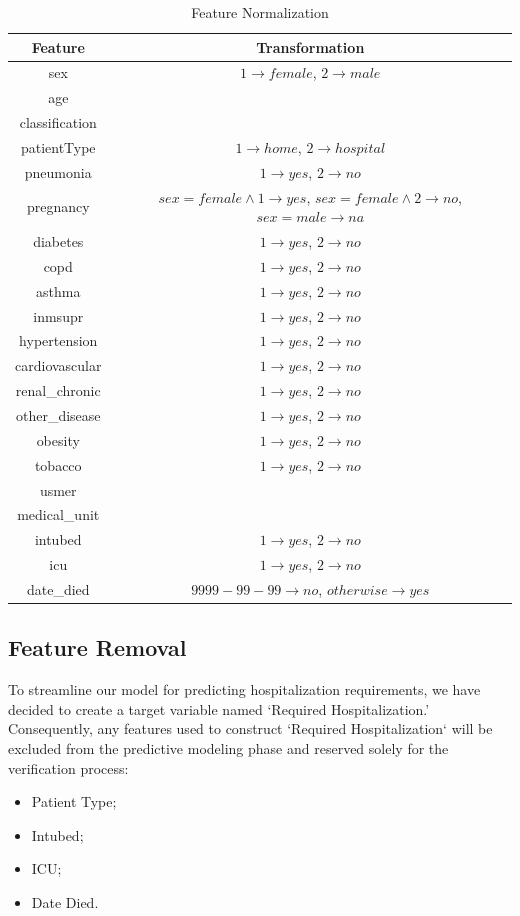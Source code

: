 \begin{table}[H]
    \centering
    \caption{Feature Normalization}
    \label{tab:feat_normalization}
    \begin{tabular}{cc} \hline 
     \textbf{Feature} & \textbf{Transformation} \\ \hline\hline
      sex &  $1 \to female$, $2 \to male$ \\ 
      age &  \\ 
      classification &  \\ 
      patientType & $1 \to home$, $2 \to hospital$ \\ 
      pneumonia & $1 \to yes$, $2 \to no$ \\ 
      pregnancy & $sex = female \land 1 \to yes$, $sex = female \land 2\to no$, $sex = male \to na$ \\
      diabetes & $1 \to yes$, $2 \to no$ \\ 
      copd & $1 \to yes$, $2 \to no$ \\ 
      asthma & $1 \to yes$, $2 \to no$ \\ 
      inmsupr & $1 \to yes$, $2 \to no$ \\ 
      hypertension & $1 \to yes$, $2 \to no$ \\ 
      cardiovascular & $1 \to yes$, $2 \to no$ \\ 
      renal\_chronic & $1 \to yes$, $2 \to no$ \\ 
      other\_disease & $1 \to yes$, $2 \to no$ \\ 
      obesity & $1 \to yes$, $2 \to no$ \\
      tobacco & $1 \to yes$, $2 \to no$ \\
      usmer & \\
      medical\_unit & \\
      intubed & $1 \to yes$, $2 \to no$ \\ 
      icu & $1 \to yes$, $2 \to no$ \\ 
      date\_died & $9999-99-99 \to no$, $otherwise \to yes$\\ \hline 
    \end{tabular}
\end{table}

\subsection{Feature Removal}
To streamline our model for predicting hospitalization
requirements, we have decided to create a target variable named 
`Required Hospitalization.' Consequently, any features used to
construct `Required Hospitalization` will be excluded from the 
predictive modeling phase and reserved solely
for the verification process:
\begin{itemize}
    \item Patient Type;
    \item Intubed;
    \item ICU;
    \item Date Died.
\end{itemize}

